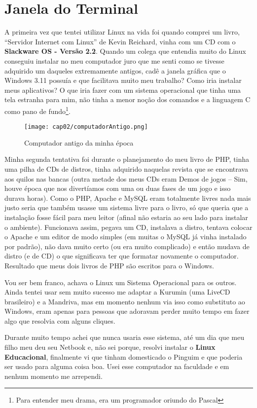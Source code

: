 \section{Janela do Terminal}
A primeira vez que tentei utilizar Linux na vida foi quando comprei um livro, ``Servidor Internet com Linux'' de Kevin Reichard, vinha com um CD com o \textbf{Slackware OS - Versão 2.2}. Quando um colega que entendia muito do Linux conseguiu instalar no meu computador juro que me senti como se tivesse adquirido um daqueles extremamente antigos, cadê a janela gráfica que o Windows 3.11 possuía e que facilitava muito meu trabalho? Como iria instalar meus aplicativos? O que iria fazer com um sistema operacional que tinha uma tela estranha para mim, não tinha a menor noção dos comandos e a linguagem C como pano de fundo\footnote{Para entender meu drama, era um programador oriundo do Pascal}.
\begin{figure}[H]
 \centering\texttt{[image: cap02/computadorAntigo.png]}
 \caption{Computador antigo da minha época}
\end{figure}

Minha segunda tentativa foi durante o planejamento do meu livro de PHP, tinha uma pilha de CDs de distros, tinha adquirido naquelas revista que se encontrava aos quilos nas bancas (outra metade dos meus CDs eram Demos de jogos – Sim, houve época que nos divertíamos com uma ou duas fases de um jogo e isso durava horas). Como o PHP, Apache e MySQL eram totalmente livres nada mais justo seria que também usasse um sistema livre para o livro, só que queria que a instalação fosse fácil para meu leitor (afinal não estaria ao seu lado para instalar o ambiente). Funcionava assim, pegava um CD, instalava a distro, tentava colocar o Apache e um editor de modo simples (em muitas o MySQL já vinha instalado por padrão), não dava muito certo (ou era muito complicado) e então mudava de distro (e de CD) o que significava ter que formatar novamente o computador. Resultado que meus dois livros de PHP são escritos para o Windows.

Vou ser bem franco, achava o Linux um Sistema Operacional para os outros. Ainda tentei usar sem muito sucesso me adaptar a Kurumin (uma LiveCD brasileiro) e a Mandriva, mas em momento nenhum via isso como substituto ao Windows, eram apenas para pessoas que adoravam perder muito tempo em fazer algo que resolvia com alguns cliques.

Durante muito tempo achei que nunca usaria esse sistema, até um dia que meu filho meu deu seu Netbook e, não sei porque, resolvi instalar o \textbf{Linux Educacional}, finalmente vi que tinham domesticado o Pinguim e que poderia ser usado para alguma coisa boa. Usei esse computador na faculdade e em nenhum momento me arrependi.

